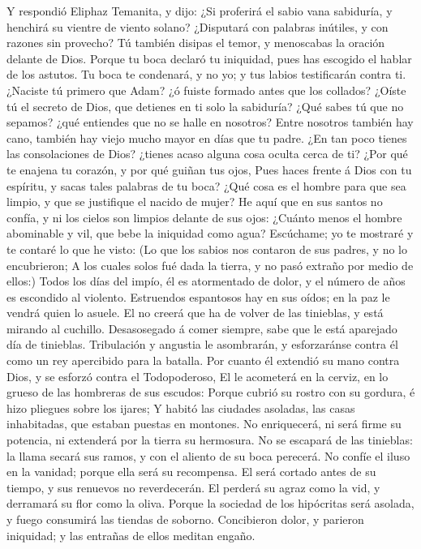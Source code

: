  Y respondió Eliphaz Temanita, y dijo:  ¿Si
proferirá el sabio vana sabiduría, y henchirá su vientre de viento
solano?  ¿Disputará con palabras inútiles, y con razones
sin provecho?  Tú también disipas el temor, y menoscabas
la oración delante de Dios.  Porque tu boca declaró tu
iniquidad, pues has escogido el hablar de los astutos.  Tu
boca te condenará, y no yo; y tus labios testificarán contra ti.
 ¿Naciste tú primero que Adam? ¿ó fuiste formado antes que
los collados?  ¿Oíste tú el secreto de Dios, que detienes
en ti solo la sabiduría?  ¿Qué sabes tú que no sepamos?
¿qué entiendes que no se halle en nosotros?  Entre
nosotros también hay cano, también hay viejo mucho mayor en días que tu
padre.  ¿En tan poco tienes las consolaciones de Dios?
¿tienes acaso alguna cosa oculta cerca de ti?  ¿Por qué
te enajena tu corazón, y por qué guiñan tus ojos,  Pues
haces frente á Dios con tu espíritu, y sacas tales palabras de tu boca?
 ¿Qué cosa es el hombre para que sea limpio, y que se
justifique el nacido de mujer?  He aquí que en sus santos
no confía, y ni los cielos son limpios delante de sus ojos:
 ¿Cuánto menos el hombre abominable y vil, que bebe la
iniquidad como agua?  Escúchame; yo te mostraré y te
contaré lo que he visto:  (Lo que los sabios nos contaron
de sus padres, y no lo encubrieron;  A los cuales solos
fué dada la tierra, y no pasó extraño por medio de ellos:)
 Todos los días del impío, él es atormentado de dolor, y
el número de años es escondido al violento.  Estruendos
espantosos hay en sus oídos; en la paz le vendrá quien lo asuele.
 El no creerá que ha de volver de las tinieblas, y está
mirando al cuchillo.  Desasosegado á comer siempre, sabe
que le está aparejado día de tinieblas.  Tribulación y
angustia le asombrarán, y esforzaránse contra él como un rey apercibido
para la batalla.  Por cuanto él extendió su mano contra
Dios, y se esforzó contra el Todopoderoso,  El le
acometerá en la cerviz, en lo grueso de las hombreras de sus escudos:
 Porque cubrió su rostro con su gordura, é hizo pliegues
sobre los ijares;  Y habitó las ciudades asoladas, las
casas inhabitadas, que estaban puestas en montones.  No
enriquecerá, ni será firme su potencia, ni extenderá por la tierra su
hermosura.  No se escapará de las tinieblas: la llama
secará sus ramos, y con el aliento de su boca perecerá. 
No confíe el iluso en la vanidad; porque ella será su recompensa.
 El será cortado antes de su tiempo, y sus renuevos no
reverdecerán.  El perderá su agraz como la vid, y
derramará su flor como la oliva.  Porque la sociedad de
los hipócritas será asolada, y fuego consumirá las tiendas de soborno.
 Concibieron dolor, y parieron iniquidad; y las entrañas
de ellos meditan engaño.

